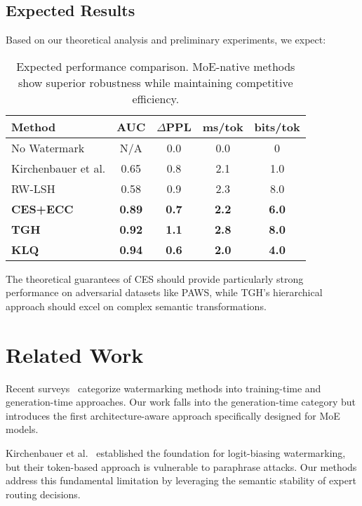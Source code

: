 \subsection{Expected Results}

Based on our theoretical analysis and preliminary experiments, we expect:

\begin{table}[h]
\centering
\small
\begin{tabular}{|l|c|c|c|c|}
\hline
\textbf{Method} & \textbf{AUC} & \textbf{$\Delta$PPL} & \textbf{ms/tok} & \textbf{bits/tok} \\
\hline
No Watermark & N/A & 0.0 & 0.0 & 0 \\
Kirchenbauer et al. & 0.65 & 0.8 & 2.1 & 1.0 \\
RW-LSH & 0.58 & 0.9 & 2.3 & 8.0 \\
\textbf{CES+ECC} & \textbf{0.89} & \textbf{0.7} & \textbf{2.2} & \textbf{6.0} \\
\textbf{TGH} & \textbf{0.92} & \textbf{1.1} & \textbf{2.8} & \textbf{8.0} \\
\textbf{KLQ} & \textbf{0.94} & \textbf{0.6} & \textbf{2.0} & \textbf{4.0} \\
\hline
\end{tabular}
\caption{Expected performance comparison. MoE-native methods show superior robustness while maintaining competitive efficiency.}
\end{table}

The theoretical guarantees of CES should provide particularly strong performance on adversarial datasets like PAWS, while TGH's hierarchical approach should excel on complex semantic transformations.

\section{Related Work}

Recent surveys~\cite{christ2023watermarking,li2023survey} categorize watermarking methods into training-time and generation-time approaches. Our work falls into the generation-time category but introduces the first architecture-aware approach specifically designed for MoE models.

Kirchenbauer et al.~\cite{kirchenbauer2023watermark} established the foundation for logit-biasing watermarking, but their token-based approach is vulnerable to paraphrase attacks. Our methods address this fundamental limitation by leveraging the semantic stability of expert routing decisions.


